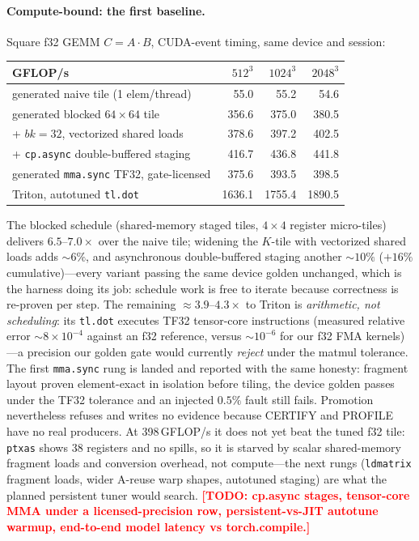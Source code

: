 \documentclass[11pt]{article}
\newcommand{\todo}[1]{\textcolor{red}{\textbf{[TODO: #1]}}}
\newcommand{\code}[1]{\texttt{#1}}
\begin{document}
\paragraph{Compute-bound: the first baseline.} Square f32 GEMM
$C=A\cdot B$, CUDA-event timing, same device and session:

\begin{center}\begin{tabular}{lrrr}
\toprule
GFLOP/s & $512^3$ & $1024^3$ & $2048^3$\\
\midrule
generated naive tile (1 elem/thread) & 55.0 & 55.2 & 54.6\\
generated blocked $64{\times}64$ tile & 356.6 & 375.0 & 380.5\\
\quad + $bk{=}32$, vectorized shared loads & 378.6 & 397.2 & 402.5\\
\quad + \code{cp.async} double-buffered staging & 416.7 & 436.8 & 441.8\\
generated \code{mma.sync} TF32, gate-licensed & 375.6 & 393.5 & 398.5\\
Triton, autotuned \code{tl.dot} & 1636.1 & 1755.4 & 1890.5\\
\bottomrule
\end{tabular}\end{center}

The blocked schedule (shared-memory staged tiles, $4{\times}4$ register
micro-tiles) delivers $6.5$--$7.0\times$ over the naive tile; widening
the $K$-tile with vectorized shared loads adds ${\sim}6\%$, and
asynchronous double-buffered staging another ${\sim}10\%$ (${+}16\%$
cumulative)---every variant passing the same device golden unchanged,
which is the harness doing its job: schedule work is free to iterate
because correctness is re-proven per step. The remaining
$\approx\!3.9$--$4.3\times$ to
Triton is \emph{arithmetic, not scheduling}: its \code{tl.dot} executes
TF32 tensor-core instructions (measured relative error ${\sim}8{\times}
10^{-4}$ against an f32 reference, versus ${\sim}10^{-6}$ for our f32 FMA
kernels)---a precision our golden gate would currently \emph{reject}
under the matmul tolerance. The first \code{mma.sync} rung is landed and reported with the same
honesty: fragment layout proven element-exact in isolation before tiling,
the device golden passes under the TF32 tolerance and an injected $0.5\%$
fault still fails. Promotion nevertheless refuses and writes no evidence
because CERTIFY and PROFILE have no real producers. At 398\,GFLOP/s it
does not yet beat the tuned f32 tile:
\code{ptxas} shows 38 registers and no spills, so it is starved by scalar
shared-memory fragment loads and conversion overhead, not compute---the
next rungs (\code{ldmatrix} fragment loads, wider A-reuse warp shapes,
autotuned staging) are what the planned persistent tuner would search. \todo{cp.async stages, tensor-core
MMA under a licensed-precision row, persistent-vs-JIT autotune warmup,
end-to-end model latency vs torch.compile.}
\end{document}
